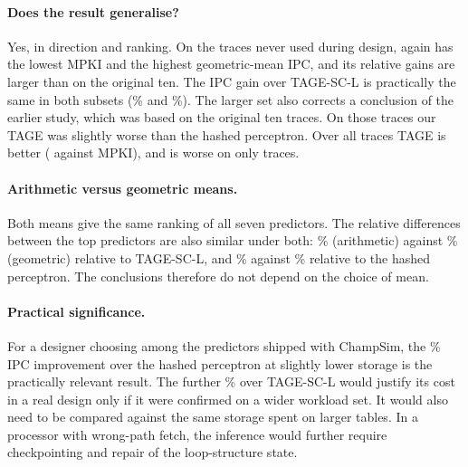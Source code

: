 \paragraph{Does the result generalise?} Yes, in direction and ranking. On the  traces never used during design, \prop{} again has the lowest MPKI and the highest geometric-mean IPC, and its relative gains are larger than on the original ten. The IPC gain over TAGE-SC-L is practically the same in both subsets (\% and \%). The larger set also corrects a conclusion of the earlier study, which was based on the original ten traces. On those traces our TAGE was slightly worse than the hashed perceptron. Over all  traces TAGE is better ( against  MPKI), and is worse on only  traces.

\paragraph{Arithmetic versus geometric means.} Both means give the same ranking of all seven predictors. The relative differences between the top predictors are also similar under both: \% (arithmetic) against \% (geometric) relative to TAGE-SC-L, and \% against \% relative to the hashed perceptron. The conclusions therefore do not depend on the choice of mean.

\paragraph{Practical significance.} For a designer choosing among the predictors shipped with ChampSim, the \% IPC improvement over the hashed perceptron at slightly lower storage is the practically relevant result. The further \% over TAGE-SC-L would justify its cost in a real design only if it were confirmed on a wider workload set. It would also need to be compared against the same storage spent on larger tables. In a processor with wrong-path fetch, the inference would further require checkpointing and repair of the loop-structure state.
